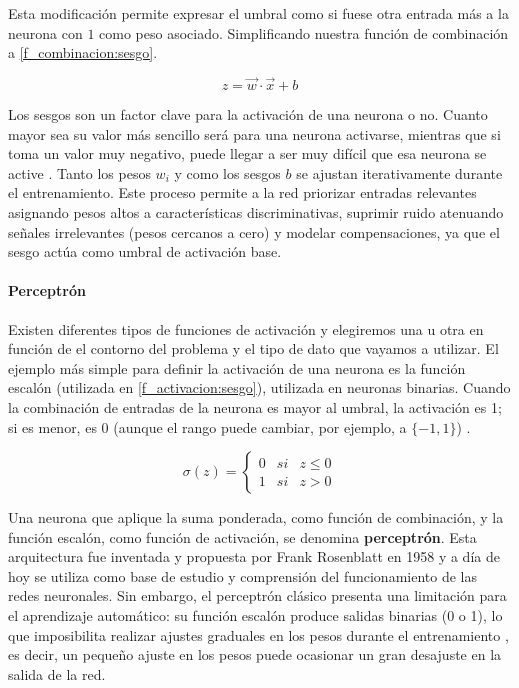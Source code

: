 Esta modificación permite expresar el umbral como si fuese otra entrada más a la neurona con $1$ como peso asociado. Simplificando nuestra función de combinación a \ref{f_combinacion:sesgo}.

\begin{equation}\label{f_combinacion:sesgo}
z = \vec{w} \cdot \vec{x} + b
\end{equation}

Los sesgos son un factor clave para la activación de una neurona o no. Cuanto mayor sea su valor más sencillo será para una neurona activarse, mientras que si toma un valor muy negativo, puede llegar a ser muy difícil que esa neurona se active \cite{nn_dl__michael_nielsen_2015}. Tanto los pesos $w_i$ y como los sesgos $b$ se ajustan iterativamente durante el entrenamiento. Este proceso permite a la red priorizar entradas relevantes asignando pesos altos a características discriminativas, suprimir ruido atenuando señales irrelevantes (pesos cercanos a cero) y modelar compensaciones, ya que el sesgo actúa como umbral de activación base.


\paragraph{Perceptrón}

Existen diferentes tipos de funciones de activación y elegiremos una u otra en función de el contorno del problema y el tipo de dato que vayamos a utilizar. El ejemplo más simple para definir la activación de una neurona es la función escalón (utilizada en \ref{f_activacion:sesgo}), utilizada en neuronas binarias. Cuando la combinación de entradas de la neurona es mayor al umbral, la activación es 1; si es menor, es 0 (aunque el rango puede cambiar, por ejemplo, a $\{-1,1\}$) \cite{rna_fundamentos__hilera_2021}.

\begin{equation}\label{f_activacion:escalon}
   \sigma(z) = \left \{
        \begin{array}{ccc}
            0 & si & z \leq 0 \\
            1 & si & z > 0
        \end{array}
   \right .
\end{equation}

Una neurona que aplique la suma ponderada, como función de combinación, y la función escalón, como función de activación, se denomina \textbf{perceptrón}. Esta arquitectura fue inventada y propuesta por Frank Rosenblatt en 1958 \cite{perceptron__rosenblatt_1958} y a día de hoy se utiliza como base de estudio y comprensión del funcionamiento de las redes neuronales. Sin embargo, el perceptrón clásico presenta una limitación para el aprendizaje automático: su función escalón produce salidas binarias (0 o 1), lo que imposibilita realizar ajustes graduales en los pesos durante el entrenamiento \cite{nn_dl__michael_nielsen_2015}, es decir, un pequeño ajuste en los pesos puede ocasionar un gran desajuste en la salida de la red.

